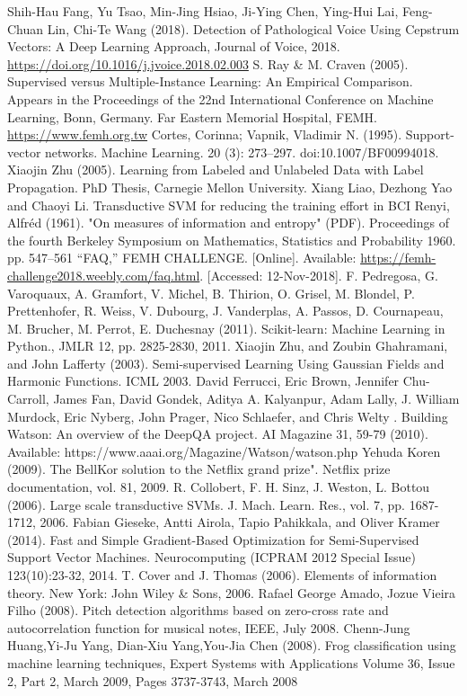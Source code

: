\documentclass[conference]{IEEEtran}
\begin{document}
\begin{thebibliography}{00}
Shih-Hau Fang, Yu Tsao, Min-Jing Hsiao, Ji-Ying Chen, Ying-Hui Lai, Feng-Chuan Lin, Chi-Te Wang (2018).
Detection of Pathological Voice Using Cepstrum Vectors: A Deep Learning Approach,
Journal of Voice, 2018. \url{https://doi.org/10.1016/j.jvoice.2018.02.003}
S. Ray \& M. Craven (2005).
Supervised versus Multiple-Instance Learning: An Empirical Comparison.
Appears in the Proceedings of the 22nd International Conference on Machine Learning, Bonn, Germany.
Far Eastern Memorial Hospital, FEMH. \url{https://www.femh.org.tw}
Cortes, Corinna; Vapnik, Vladimir N. (1995). Support-vector networks. Machine Learning. 20 (3): 273–297. doi:10.1007/BF00994018.
Xiaojin Zhu (2005). Learning from Labeled and Unlabeled Data with Label Propagation. PhD Thesis, Carnegie Mellon University.
Xiang Liao, Dezhong Yao and Chaoyi Li. Transductive SVM for reducing the training effort in BCI
Renyi, Alfréd (1961). "On measures of information and entropy" (PDF). Proceedings of the fourth Berkeley Symposium on Mathematics, Statistics and Probability 1960. pp. 547–561
“FAQ,” FEMH CHALLENGE. [Online]. Available: \url{https://femh-challenge2018.weebly.com/faq.html}. [Accessed: 12-Nov-2018].
F. Pedregosa, G. Varoquaux, A. Gramfort, V. Michel, B. Thirion, O. Grisel, M. Blondel, P. Prettenhofer, R. Weiss, V. Dubourg, J. Vanderplas, A. Passos, D. Cournapeau, M. Brucher, M. Perrot, E. Duchesnay (2011). Scikit-learn: Machine Learning in Python., JMLR 12, pp. 2825-2830, 2011.
Xiaojin Zhu, and Zoubin Ghahramani, and John Lafferty (2003). Semi-supervised Learning Using Gaussian Fields and Harmonic Functions. ICML 2003.
David Ferrucci, Eric Brown, Jennifer Chu-Carroll, James Fan, David Gondek, Aditya A. Kalyanpur, Adam Lally, J. William Murdock, Eric Nyberg, John Prager, Nico Schlaefer, and Chris Welty . Building Watson: An overview of the DeepQA project. AI Magazine 31, 59-79 (2010). Available: https://www.aaai.org/Magazine/Watson/watson.php
Yehuda Koren (2009). The BellKor solution to the Netflix grand prize". Netflix prize documentation, vol. 81, 2009.
R. Collobert, F. H. Sinz, J. Weston, L. Bottou (2006). Large scale transductive SVMs. J. Mach. Learn. Res., vol. 7, pp. 1687-1712, 2006.
Fabian Gieseke, Antti Airola, Tapio Pahikkala, and Oliver Kramer (2014). Fast and Simple Gradient-Based Optimization for Semi-Supervised Support Vector Machines. Neurocomputing (ICPRAM 2012 Special Issue) 123(10):23-32, 2014. 
T. Cover and J. Thomas (2006). Elements of information theory. New York: John Wiley \& Sons, 2006.
Rafael George Amado, Jozue Vieira Filho (2008). Pitch detection algorithms based on zero-cross rate and autocorrelation function for musical notes, IEEE, July 2008.
Chenn-Jung Huang,Yi-Ju Yang, Dian-Xiu Yang,You-Jia Chen (2008). Frog classification using machine learning techniques, Expert Systems with Applications Volume 36, Issue 2, Part 2, March 2009, Pages 3737-3743, March 2008
\end{thebibliography}
\end{document}
